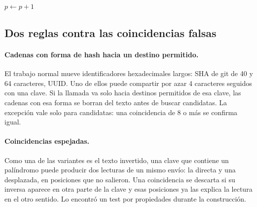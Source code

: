 \begin{algorithm}[ht]
\caption{Una llamada en el contador de bits ().}\label{alg:observe}
$p \leftarrow p + 1$ 
\end{algorithm}

\subsection{Dos reglas contra las coincidencias falsas}

\paragraph{Cadenas con forma de hash hacia un destino permitido.} El trabajo normal mueve
identificadores hexadecimales largos: SHA de git de 40 y 64 caracteres, UUID. Uno de ellos puede
compartir por azar 4 caracteres seguidos con una clave. Si la llamada va solo hacia destinos
permitidos de esa clave, las cadenas con esa forma se borran del texto antes de buscar candidatas. La
excepción vale solo para candidatas: una coincidencia de 8 o más se confirma igual.

\paragraph{Coincidencias espejadas.} Como una de las variantes es el texto invertido, una clave que
contiene un palíndromo puede producir dos lecturas de un mismo envío: la directa y una desplazada, en
posiciones que no salieron. Una coincidencia se descarta si su inversa aparece en otra parte de la
clave y esas posiciones ya las explica la lectura en el otro sentido. Lo encontró un test por
propiedades durante la construcción.

